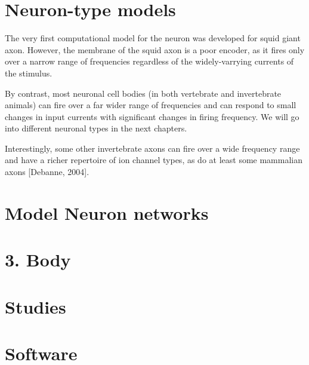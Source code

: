 \documentclass[11pt]{book}
\begin{document}
\part{Neuron-type models}
The very first computational model for the neuron was developed for
squid giant axon. However, the membrane of the squid axon is a poor encoder, as
it fires only over a narrow range of frequencies regardless of the
widely-varrying currents of the stimulus.

By contrast, most neuronal cell bodies (in both vertebrate and invertebrate
animals) can fire over a far wider range of frequencies and can respond to small
changes in input currents with significant changes in firing frequency. We will
go into different neuronal types in the next chapters.

Interestingly, some other invertebrate axons can fire over a wide frequency
range and have a richer repertoire of ion channel types, as do at least some
mammalian axons [Debanne, 2004].










\part{Model Neuron networks} 




\part{3. Body}




\part{Studies}



%
\part{Software}
\label{part:Modeling-Software}
\end{document}
